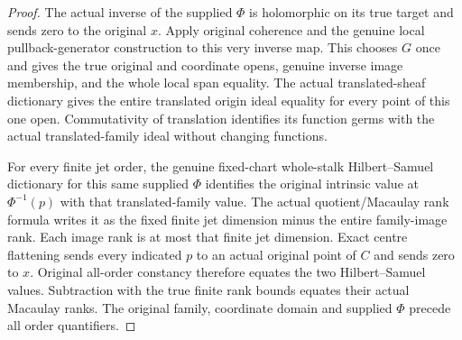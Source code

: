 \begin{proof}
The actual inverse of the supplied $\Phi$ is holomorphic on its true target and sends zero to the original $x$. Apply original coherence and the genuine local pullback-generator construction to this very inverse map. This chooses $G$ once and gives the true original and coordinate opens, genuine inverse image membership, and the whole local span equality. The actual translated-sheaf dictionary gives the entire translated origin ideal equality for every point of this one open. Commutativity of translation identifies its function germs with the actual translated-family ideal without changing functions.

For every finite jet order, the genuine fixed-chart whole-stalk Hilbert--Samuel dictionary for this same supplied $\Phi$ identifies the original intrinsic value at $\Phi^{-1}(p)$ with that translated-family value. The actual quotient/Macaulay rank formula writes it as the fixed finite jet dimension minus the entire family-image rank. Each image rank is at most that finite jet dimension. Exact centre flattening sends every indicated $p$ to an actual original point of $C$ and sends zero to $x$. Original all-order constancy therefore equates the two Hilbert--Samuel values. Subtraction with the true finite rank bounds equates their actual Macaulay ranks. The original family, coordinate domain and supplied $\Phi$ precede all order quantifiers.
\end{proof}

